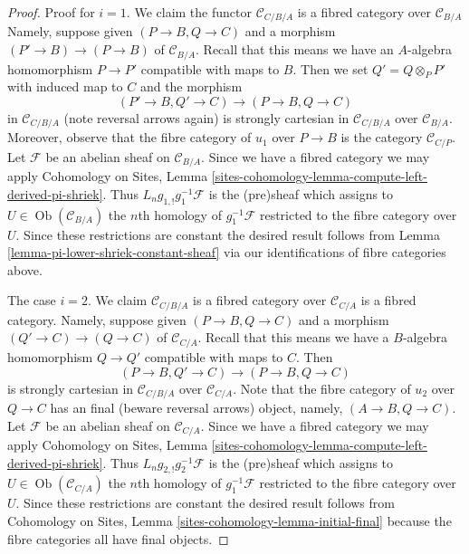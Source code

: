 \documentclass[10pt,a4paper]{amsart}
\theoremstyle{plain}
\theoremstyle{definition}
\theoremstyle{remark}
\numberwithin{equation}{subsection}
\def\Ob{\mathop{\mathrm{Ob}}\nolimits}
\begin{document}
\begin{proof}
Proof for $i = 1$. We claim the functor $\mathcal{C}_{C/B/A}$
is a fibred category over $\mathcal{C}_{B/A}$
Namely, suppose given $(P \to B, Q \to C)$
and a morphism $(P' \to B) \to (P \to B)$ of $\mathcal{C}_{B/A}$.
Recall that this means we have an $A$-algebra homomorphism
$P \to P'$ compatible with maps to $B$. Then we set $Q' = Q \otimes_P P'$
with induced map to $C$ and the morphism
$$
(P' \to B, Q' \to C) \longrightarrow (P \to B, Q \to C)
$$
in $\mathcal{C}_{C/B/A}$ (note reversal arrows again) is strongly cartesian
in $\mathcal{C}_{C/B/A}$ over $\mathcal{C}_{B/A}$. Moreover, observe
that the fibre category of $u_1$ over $P \to B$ is the category
$\mathcal{C}_{C/P}$. Let $\mathcal{F}$ be an abelian sheaf on
$\mathcal{C}_{B/A}$. Since we have a fibred category we may apply
Cohomology on Sites, Lemma
\ref{sites-cohomology-lemma-compute-left-derived-pi-shriek}.
Thus $L_ng_{1, !}g_1^{-1}\mathcal{F}$ is the (pre)sheaf
which assigns to $U \in \Ob(\mathcal{C}_{B/A})$ the $n$th homology of
$g_1^{-1}\mathcal{F}$ restricted to the fibre category over $U$.
Since these restrictions are constant the desired result follows from
Lemma \ref{lemma-pi-lower-shriek-constant-sheaf}
via our identifications of fibre categories above.

\medskip\noindent
The case $i = 2$.
We claim $\mathcal{C}_{C/B/A}$ is a fibred category over $\mathcal{C}_{C/A}$
is a fibred category. Namely, suppose given $(P \to B, Q \to C)$
and a morphism $(Q' \to C) \to (Q \to C)$ of $\mathcal{C}_{C/A}$.
Recall that this means we have a $B$-algebra homomorphism
$Q \to Q'$ compatible with maps to $C$. Then
$$
(P \to B, Q' \to C) \longrightarrow (P \to B, Q \to C)
$$
is strongly cartesian in $\mathcal{C}_{C/B/A}$ over $\mathcal{C}_{C/A}$.
Note that the fibre category of $u_2$ over $Q \to C$ has an final
(beware reversal arrows) object, namely, $(A \to B, Q \to C)$. Let
$\mathcal{F}$ be an abelian sheaf on $\mathcal{C}_{C/A}$.
Since we have a fibred category we may apply
Cohomology on Sites, Lemma
\ref{sites-cohomology-lemma-compute-left-derived-pi-shriek}.
Thus $L_ng_{2, !}g_2^{-1}\mathcal{F}$ is the (pre)sheaf
which assigns to $U \in \Ob(\mathcal{C}_{C/A})$ the $n$th homology of
$g_1^{-1}\mathcal{F}$ restricted to the fibre category over $U$.
Since these restrictions are constant the desired result follows from
Cohomology on Sites, Lemma \ref{sites-cohomology-lemma-initial-final}
because the fibre categories all have final objects.


\end{proof}
\end{document}
